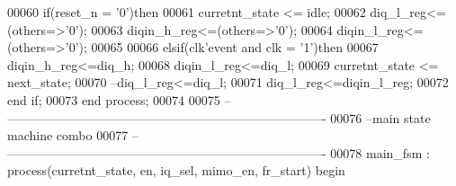 \begin{DoxyCode}
00060     \textcolor{keywordflow}{if}\textcolor{vhdlchar}{(}\textcolor{vhdlchar}{reset_n} \textcolor{vhdlchar}{=} \textcolor{vhdlchar}{'}\textcolor{vhdllogic}{}\textcolor{vhdllogic}{0}\textcolor{vhdlchar}{'}\textcolor{vhdlchar}{)}\textcolor{keywordflow}{then}
00061         \textcolor{vhdlchar}{curretnt_state} \textcolor{vhdlchar}{<=} \textcolor{vhdlchar}{idle};
00062         \textcolor{vhdlchar}{diq_l_reg}\textcolor{vhdlchar}{<=}\textcolor{vhdlchar}{(}\textcolor{keywordflow}{others}\textcolor{vhdlchar}{=}\textcolor{vhdlchar}{>}\textcolor{vhdlchar}{'}\textcolor{vhdllogic}{}\textcolor{vhdllogic}{0}\textcolor{vhdlchar}{'}\textcolor{vhdlchar}{)};
00063         \textcolor{vhdlchar}{diqin_h_reg}\textcolor{vhdlchar}{<=}\textcolor{vhdlchar}{(}\textcolor{keywordflow}{others}\textcolor{vhdlchar}{=}\textcolor{vhdlchar}{>}\textcolor{vhdlchar}{'}\textcolor{vhdllogic}{}\textcolor{vhdllogic}{0}\textcolor{vhdlchar}{'}\textcolor{vhdlchar}{)};
00064         \textcolor{vhdlchar}{diqin_l_reg}\textcolor{vhdlchar}{<=}\textcolor{vhdlchar}{(}\textcolor{keywordflow}{others}\textcolor{vhdlchar}{=}\textcolor{vhdlchar}{>}\textcolor{vhdlchar}{'}\textcolor{vhdllogic}{}\textcolor{vhdllogic}{0}\textcolor{vhdlchar}{'}\textcolor{vhdlchar}{)};
00065 
00066     \textcolor{keywordflow}{elsif}\textcolor{vhdlchar}{(}\textcolor{vhdlchar}{clk}\textcolor{vhdlchar}{'}\textcolor{vhdlkeyword}{event} \textcolor{keywordflow}{and} \textcolor{vhdlchar}{clk} \textcolor{vhdlchar}{=} \textcolor{vhdlchar}{'}\textcolor{vhdllogic}{}\textcolor{vhdllogic}{1}\textcolor{vhdlchar}{'}\textcolor{vhdlchar}{)}\textcolor{keywordflow}{then} 
00067         \textcolor{vhdlchar}{diqin_h_reg}\textcolor{vhdlchar}{<=}\textcolor{vhdlchar}{diq_h};
00068         \textcolor{vhdlchar}{diqin_l_reg}\textcolor{vhdlchar}{<=}\textcolor{vhdlchar}{diq_l};
00069         \textcolor{vhdlchar}{curretnt_state} \textcolor{vhdlchar}{<=} \textcolor{vhdlchar}{next_state};
00070 \textcolor{keyword}{        --diq\_l\_reg<=diq\_l;}
00071         \textcolor{vhdlchar}{diq_l_reg}\textcolor{vhdlchar}{<=}\textcolor{vhdlchar}{diqin_l_reg};
00072     \textcolor{keywordflow}{end} \textcolor{keywordflow}{if}; 
00073 \textcolor{keywordflow}{end} \textcolor{keywordflow}{process};
00074 
00075 \textcolor{keyword}{-- ----------------------------------------------------------------------------}
00076 \textcolor{keyword}{--main state machine combo}
00077 \textcolor{keyword}{-- ----------------------------------------------------------------------------}
00078 main\_fsm : \textcolor{keywordflow}{process}(curretnt_state, en, iq_sel, mimo_en, fr_start) \textcolor{keywordflow}{begin}

\end{DoxyCode}
